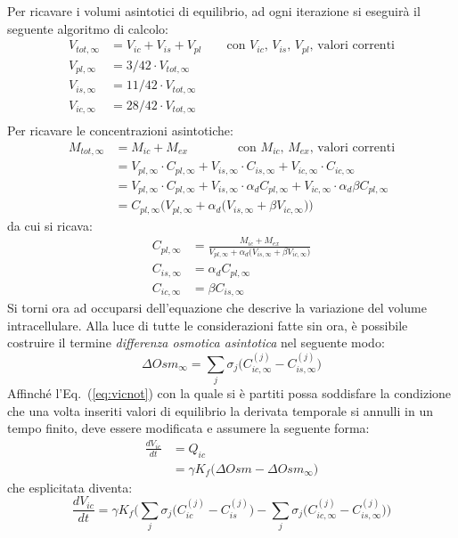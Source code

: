 Per ricavare i volumi asintotici di equilibrio, ad ogni iterazione si eseguirà il seguente algoritmo di calcolo:
\begin{align}
		V_{tot,\infty}      &= V_{ic}+V_{is}+V_{pl}   \qquad \text{con $V_{ic}$, $V_{is}$, $V_{pl}$, valori correnti}\\
		V_{pl,\infty}       &= 3/42  \cdot V_{tot,\infty} \\
		V_{is,\infty}       &= 11/42 \cdot V_{tot,\infty} \\
		V_{ic,\infty}       &= 28/42 \cdot V_{tot,\infty} \\
\end{align}
Per ricavare le concentrazioni asintotiche:
\begin{align*}
		M_{tot,\infty} &= M_{ic}+M_{ex} \qquad\qquad \text{con $M_{ic}$, $M_{ex}$, valori correnti}\\
		                     &= V_{pl,\infty}\cdot C_{pl,\infty} + V_{is,\infty}\cdot C_{is,\infty}  + V_{ic,\infty}\cdot C_{ic,\infty} \\
		                     &= V_{pl,\infty}\cdot C_{pl,\infty} + V_{is,\infty}\cdot\alpha_d C_{pl,\infty}  + V_{ic,\infty}\cdot\alpha_d\beta C_{pl,\infty}   \\
		                     &= C_{pl,\infty} \biggl(V_{pl,\infty} + \alpha_d\bigl(V_{is,\infty} + \beta V_{ic,\infty}\bigr)\biggr)
\end{align*}
da cui si ricava:
\begin{align}
		C_{pl,\infty} &= \frac{M_{ic}+M_{ex}}{V_{pl,\infty} + \alpha_d\bigl(V_{is,\infty} + \beta V_{ic,\infty}\bigr)} \\
		C_{is,\infty} &= \alpha_d C_{pl,\infty} \\
		C_{ic,\infty} &= \beta  C_{is,\infty} 
\end{align}
\newline
\indent
Si torni ora ad occuparsi dell'equazione che descrive la variazione del volume intracellulare. Alla luce di tutte le considerazioni fatte sin ora, è possibile costruire il termine \textit{differenza osmotica asintotica} nel seguente modo:
\begin{equation}
	\Delta Osm_{\infty} = \sum_j{\sigma_j\bigl(C_{ic,\infty}^{(j)}-C_{is,\infty}^{(j)}\bigr)}
\end{equation}
Affinché l'Eq.~(\ref{eq:vicnot}) con la quale si è partiti possa soddisfare la condizione che una volta inseriti valori di equilibrio la derivata temporale si annulli in un tempo finito, deve essere modificata e assumere la seguente forma:
\begin{equation}\label{eq:vicyes}
	\begin{split}
	\frac{dV_{ic}}{dt} &= Q_{ic}\\
										 &= \gamma K_f \bigl(\Delta Osm - \Delta Osm_{\infty}\bigr)
	\end{split}										 
\end{equation}
che esplicitata diventa:
\begin{equation*}
	\frac{dV_{ic}}{dt} = \gamma K_f \biggl(\sum_j{\sigma_j\bigl(C_{ic}^{(j)}-C_{is}^{(j)}\bigr)} - \sum_j{\sigma_j\bigl(C_{ic,\infty}^{(j)}-C_{is,\infty}^{(j)}\bigr)}\biggr)
\end{equation*}

